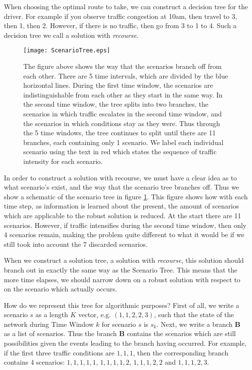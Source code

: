 When choosing the optimal route to take, we can construct a decision tree for the driver. For example if you observe traffic congestion at 10am, then travel to 3, then 1, then 2. However, if there is no traffic, then go from 3 to 1 to 4. Such a decision tree we call a solution with \textit{recourse}.



\begin{figure}[h!]
	\centering
	\texttt{[image: ScenarioTree.eps]}
	\caption{The figure above shows the way that the scenarios branch off from each other. There are 5 time intervals, which are divided by the blue horizontal lines. During the first time window, the scenarios are indistinguishable from each other as they start in the same way. In the second time window, the tree splits into two branches, the scenarios in which traffic escalates in the second time window, and the scenarios in which conditions stay as they were. Thus through the 5 time windows, the tree continues to split until there are 11 branches, each containing only 1 scenario. We label each individual scenario using the text in red which states the sequence of traffic intensity for each scenario.}
	\label{fig:scenarioTree}
\end{figure}
In order to construct a solution with recourse, we must have a clear idea as to what scenario's exist, and the way that the scenario tree branches off. Thus we show a schematic of the scenario tree in figure \ref{fig:scenarioTree}. This figure shows how with each time step, as information is learned about the present, the amount of scenarios which are applicable to the robust solution is reduced. At the start there are 11 scenarios. However, if traffic intensifies during the second time window, then only 4 scenarios remain, making the problem quite different to what it would be if we still took into account the 7 discarded scenarios.

When we construct a solution tree, a solution with \textit{recourse}, this solution should branch out in exactly the same way as the Scenario Tree. This means that the more time elapses, we should narrow down on a robust solution with respect to on the scenario which actually occurs.

How do we represent this tree for algorithmic purposes? First of all, we write a scenario $s$ as a length $K$ vector, e.g. $(1,1,2,2,3)$, such that the state of the network during Time Window $k$ for scenario $s$ is $s_k$. Next, we write a branch $\mathbf{B}$ as a list of scenarios. Thus the branch $\mathbf{B}$ contains the scenarios which are still possibilities given the events leading to the branch having occurred. For example, if the first three traffic conditions are $1,1,1$, then the corresponding branch contains 4 scenarios: $1,1,1,1,1$, $1,1,1,1,2$, $1,1,1,2,2$ and $1,1,1,2,3$.

